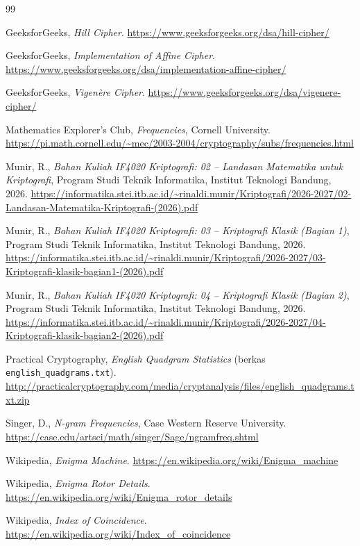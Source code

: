 \clearpage
{}
{}
\renewcommand{\bibname}{Referensi}
\begin{thebibliography}{99}

GeeksforGeeks, \textit{Hill Cipher}.
\url{https://www.geeksforgeeks.org/dsa/hill-cipher/}

GeeksforGeeks, \textit{Implementation of Affine Cipher}.
\url{https://www.geeksforgeeks.org/dsa/implementation-affine-cipher/}

GeeksforGeeks, \textit{Vigenère Cipher}.
\url{https://www.geeksforgeeks.org/dsa/vigenere-cipher/}

Mathematics Explorer's Club, \textit{Frequencies}, Cornell University.
\url{https://pi.math.cornell.edu/~mec/2003-2004/cryptography/subs/frequencies.html}

Munir, R., \textit{Bahan Kuliah IF4020 Kriptografi: 02 -- Landasan Matematika untuk Kriptografi},
Program Studi Teknik Informatika, Institut Teknologi Bandung, 2026.
\url{https://informatika.stei.itb.ac.id/~rinaldi.munir/Kriptografi/2026-2027/02-Landasan-Matematika-Kriptografi-(2026).pdf}

Munir, R., \textit{Bahan Kuliah IF4020 Kriptografi: 03 -- Kriptografi Klasik (Bagian 1)},
Program Studi Teknik Informatika, Institut Teknologi Bandung, 2026.
\url{https://informatika.stei.itb.ac.id/~rinaldi.munir/Kriptografi/2026-2027/03-Kriptografi-klasik-bagian1-(2026).pdf}

Munir, R., \textit{Bahan Kuliah IF4020 Kriptografi: 04 -- Kriptografi Klasik (Bagian 2)},
Program Studi Teknik Informatika, Institut Teknologi Bandung, 2026.
\url{https://informatika.stei.itb.ac.id/~rinaldi.munir/Kriptografi/2026-2027/04-Kriptografi-klasik-bagian2-(2026).pdf}

Practical Cryptography, \textit{English Quadgram Statistics} (berkas \texttt{english\_quadgrams.txt}).
\url{http://practicalcryptography.com/media/cryptanalysis/files/english_quadgrams.txt.zip}

Singer, D., \textit{N-gram Frequencies}, Case Western Reserve University.
\url{https://case.edu/artsci/math/singer/Sage/ngramfreq.shtml}

Wikipedia, \textit{Enigma Machine}.
\url{https://en.wikipedia.org/wiki/Enigma_machine}

Wikipedia, \textit{Enigma Rotor Details}.
\url{https://en.wikipedia.org/wiki/Enigma_rotor_details}

Wikipedia, \textit{Index of Coincidence}.
\url{https://en.wikipedia.org/wiki/Index_of_coincidence}

\end{thebibliography}
